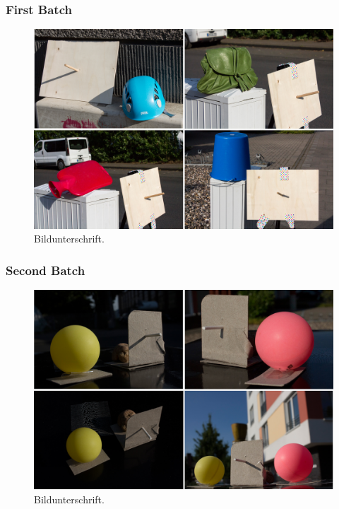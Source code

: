 \subsubsection{First Batch} \label{sec:testimagesfirst}
\begin{figure}[H] 
	\center 
	\includegraphics[width=12cm]{Images/batch1.jpg}			
	\caption[Bildunterschrift]{Bildunterschrift.}
	\label{fig:batch1}
\end{figure}

\subsubsection{Second Batch} \label{sec:testimagessecond}
\begin{figure}[H] 
	\center 
	\includegraphics[width=12cm]{Images/batch2.jpg}			
	\caption[Bildunterschrift]{Bildunterschrift.}
	\label{fig:batch2}
\end{figure}

\newpage